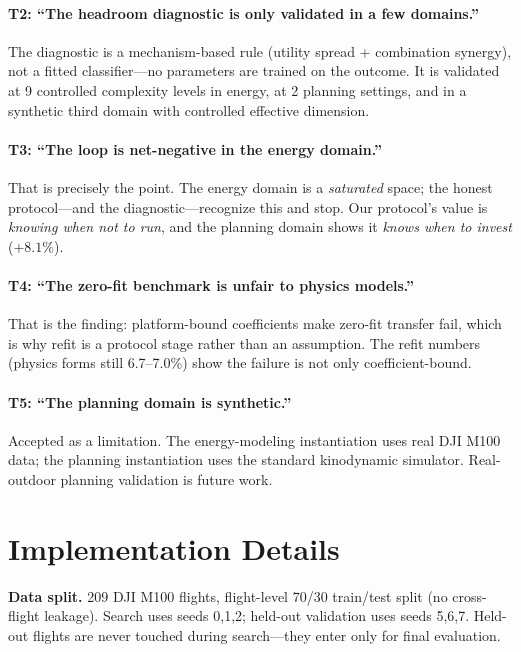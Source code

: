 \documentclass{article}
\begin{document}
\paragraph{T2: ``The headroom diagnostic is only validated in a few domains.''}
The diagnostic is a mechanism-based rule (utility spread + combination synergy), not a
fitted classifier---no parameters are trained on the outcome. It is validated at 9
controlled complexity levels in energy, at 2 planning settings, and in a synthetic third
domain with controlled effective dimension.

\paragraph{T3: ``The loop is net-negative in the energy domain.''}
That is precisely the point. The energy domain is a \emph{saturated} space; the honest
protocol---and the diagnostic---recognize this and stop. Our protocol's value is
\emph{knowing when not to run}, and the planning domain shows it \emph{knows when to
invest} ($+8.1\%$).

\paragraph{T4: ``The zero-fit benchmark is unfair to physics models.''}
That is the finding: platform-bound coefficients make zero-fit transfer fail, which is why
refit is a protocol stage rather than an assumption. The refit numbers (physics forms
still 6.7--7.0\%) show the failure is not only coefficient-bound.

\paragraph{T5: ``The planning domain is synthetic.''}
Accepted as a limitation. The energy-modeling instantiation uses real DJI M100 data; the
planning instantiation uses the standard kinodynamic simulator. Real-outdoor planning
validation is future work.

\section*{Implementation Details}
\label{app:impl}

\textbf{Data split.} 209 DJI M100 flights, flight-level 70/30 train/test split (no
cross-flight leakage). Search uses seeds 0,1,2; held-out validation uses seeds 5,6,7.
Held-out flights are never touched during search---they enter only for final evaluation.
\end{document}
